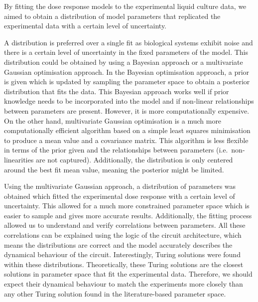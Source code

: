 By fitting the dose response models to the experimental liquid culture data, we aimed to obtain a distribution of model parameters that replicated the experimental data with a certain level of uncertainty.

A distribution is preferred over a single fit as biological systems exhibit noise and there is a certain level of uncertainty in the fixed parameters of the model.
This distribution could be obtained by using a Bayesian approach or a multivariate Gaussian optimisation approach.
In the Bayesian optimisation approach, a prior is given which is updated by sampling the parameter space to obtain a posterior distribution that fits the data.
This Bayesian approach works well if prior knowledge needs to be incorporated into the model and if non-linear relationships between parameters are present.
However, it is more computationally expensive.
On the other hand, multivariate Gaussian optimisation is a much more computationally efficient algorithm based on a simple least squares minimisation to produce a mean value and a covariance matrix.
This algorithm is less flexible in terms of the prior given and the relationships between parameters (i.e.~non-linearities are not captured).
Additionally, the distribution is only centered around the best fit mean value, meaning the posterior might be limited.

Using the multivariate Gaussian approach, a distribution of parameters was obtained
which fitted the experimental dose response with a certain level of uncertainty.
This allowed for a much more constrained parameter space which is easier to sample and gives more accurate results.
Additionally, the fitting process allowed us to understand and verify correlations between parameters.
All these correlations can be explained using the logic of the circuit architecture, which means the distributions are correct and the model accurately describes the dynamical behaviour of the circuit.
Interestingly, Turing solutions were found within these distributions.
Theoretically, these Turing solutions are the closest solutions in parameter space that fit the experimental data.
Therefore, we should expect their dynamical behaviour to match the experiments more closely than any other Turing solution found in the literature-based parameter space.


